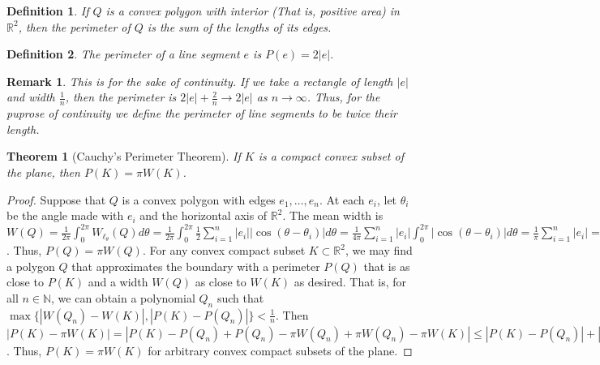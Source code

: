 \documentclass[oneside]{book}
\theoremstyle{mystyle}
\newtheorem{theorem}{Theorem}[section]
\newtheorem{definition}{Definition}[section]
\newtheorem{remark}{Remark}[section]
\begin{document}
\begin{definition}
If $Q$ is a convex polygon with interior (That is, positive area) in $\mathbb{R}^2$, then the perimeter of $Q$ is the sum of the lengths of its edges. 
\end{definition}

\begin{definition}
The perimeter of a line segment $e$ is $P(e) = 2|e|$.
\end{definition}

\begin{remark}
This is for the sake of continuity. If we take a rectangle of length $|e|$ and width $\frac{1}{n}$, then the perimeter is $2|e|+\frac{2}{n} \rightarrow 2|e|$ as $n\rightarrow \infty$. Thus, for the puprose of continuity we define the perimeter of line segments to be twice their length.
\end{remark}

\begin{theorem}[Cauchy's Perimeter Theorem]
If $K$ is a compact convex subset of the plane, then $P(K) = \pi W(K)$.
\end{theorem}
\begin{proof}
Suppose that $Q$ is a convex polygon with edges $e_1,\hdots, e_n$. At each $e_i$, let $\theta_i$ be the angle made with $e_i$ and the horizontal axis of $\mathbb{R}^2$. The mean width is $W(Q) = \frac{1}{2\pi}\int_{0}^{2\pi} W_{\ell_\theta}(Q)d\theta = \frac{1}{2\pi} \int_{0}^{2\pi} \frac{1}{2} \sum_{i=1}^{n} |e_i||\cos(\theta-\theta_i)|d\theta = \frac{1}{4\pi}\sum_{i=1}^{n} |e_i|\int_{0}^{2\pi} |\cos(\theta-\theta_i)|d\theta = \frac{1}{\pi} \sum_{i=1}^{n} |e_i| = \frac{1}{\pi} P(Q)$. Thus, $P(Q) = \pi W(Q)$. For any convex compact subset $K\subset \mathbb{R}^2$, we may find a polygon $Q$ that approximates the boundary with a perimeter $P(Q)$ that is as close to $P(K)$ and a width $W(Q)$ as close to $W(K)$ as desired. That is, for all $n\in \mathbb{N}$, we can obtain a polynomial $Q_n$ such that $\max\{|W(Q_n)-W(K)|,|P(K)-P(Q_n)|\}< \frac{1}{n}$. Then $|P(K)-\pi W(K)| = |P(K) - P(Q_n)+P(Q_n)-\pi W(Q_n)+\pi W(Q_n)-\pi W(K)| \leq |P(K)-P(Q_n)|+|P(Q_n)-\pi W(Q_n)|+\pi|W(Q_n)-W(K)| < \frac{1}{n} + 0 + \frac{\pi}{n} = \frac{1+\pi}{n} \rightarrow 0$. Thus, $P(K) = \pi W(K)$ for arbitrary convex compact subsets of the plane.
\end{proof}
 
\end{document}
